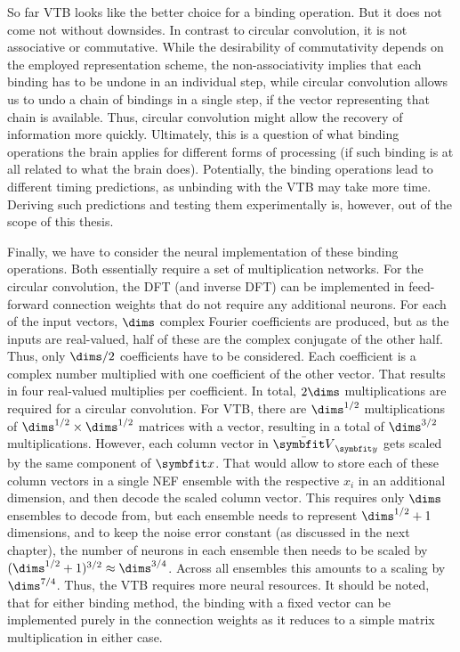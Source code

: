 So far VTB looks like the better choice for a binding operation.
But it does not come not without downsides.
In contrast to circular convolution, it is not associative or commutative.
While the desirability of commutativity depends on the employed representation scheme, the non-associativity implies that each binding has to be undone in an individual step, while circular convolution allows us to undo a chain of bindings in a single step, if the vector representing that chain is available.
Thus, circular convolution might allow the recovery of information more quickly.
Ultimately, this is a question of what binding operations the brain applies for different forms of processing (if such binding is at all related to what the brain does).
Potentially, the binding operations lead to different timing predictions, as unbinding with the VTB may take more time.
Deriving such predictions and testing them experimentally is, however, out of the scope of this thesis.

Finally, we have to consider the neural implementation of these binding operations.
Both essentially require a set of multiplication networks.
For the circular convolution, the DFT (and inverse DFT) can be implemented in feed-forward connection weights that do not require any additional neurons.
For each of the input vectors, $\dims$ complex Fourier coefficients are produced, but as the inputs are real-valued, half of these are the complex conjugate of the other half.
Thus, only $\dims / 2$ coefficients have to be considered.
Each coefficient is a complex number multiplied with one coefficient of the other vector.
That results in four real-valued multiplies per coefficient.
In total, $2\dims$ multiplications are required for a circular convolution.
For VTB, there are $\dims^{1/2}$ multiplications of $\dims^{1/2} \times \dims^{1/2}$ matrices with a vector, resulting in a total of $\dims^{3/2}$ multiplications.
However, each column vector in $\bar{\mat V}_{\vc y}$ gets scaled by the same component of $\vc x$.
That would allow to store each of these column vectors in a single NEF ensemble with the respective $x_i$ in an additional dimension, and then decode the scaled column vector.
This requires only $\dims$ ensembles to decode from, but each ensemble needs to represent $\dims^{1/2} + 1$ dimensions, and to keep the noise error constant (as discussed in the next chapter), the number of neurons in each ensemble then needs to be scaled by $(\dims^{1/2} + 1)^{3/2} \approx \dims^{3/4}$.
Across all ensembles this amounts to a scaling by $\dims^{7/4}$.
Thus, the VTB requires more neural resources.
It should be noted, that for either binding method, the binding with a fixed vector can be implemented purely in the connection weights as it reduces to a simple matrix multiplication in either case.

